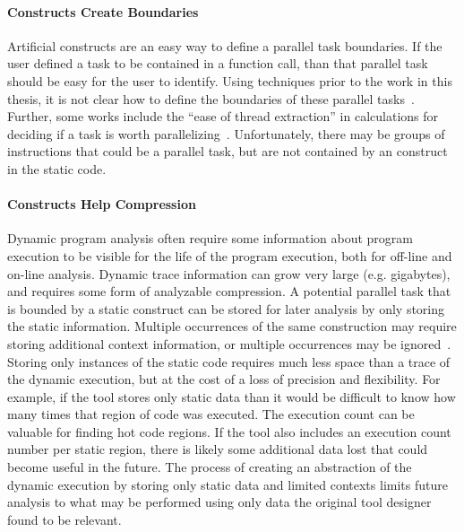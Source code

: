 \documentclass[defaultstyle,11pt]{thesis}
\begin{document}
\noindent\paragraph{Constructs Create Boundaries}

Artificial constructs are an easy way to define a parallel task
boundaries.  If the user defined a task to be contained in a function
call, than that parallel task should be easy for the user to
identify.  Using techniques prior to the work in this thesis, it is
not clear how to define the boundaries of these parallel
tasks~\cite{jeon:2011:hotpar, garcia:2011:pldi}.  Further, some works
include the ``ease of thread extraction'' in calculations for deciding
if a task is worth parallelizing~\cite{garcia:2011:pldi}.
Unfortunately, there may be groups of instructions that could be a
parallel task, but are not contained by an construct in the static
code.

\noindent\paragraph{Constructs Help Compression}

Dynamic program analysis often require some information about program
execution to be visible for the life of the program execution, both
for off-line and on-line analysis.  Dynamic trace information can grow
very large (e.g. gigabytes), and requires some form of analyzable
compression.  A potential parallel task that is bounded by a static
construct can be stored for later analysis by only storing the static
information. Multiple occurrences of the same construction may require
storing additional context information, or multiple occurrences may be
ignored~\cite{minjang:10:micro, jeon:2011:hotpar, garcia:2011:pldi}.
Storing only instances of the static code requires much less space
than a trace of the dynamic execution, but at the cost of a loss of
precision and flexibility.  For example, if the tool stores only static
data than it would be difficult to know how many times that region of
code was executed. The execution count can be valuable for finding hot
code regions.  If the tool also includes an execution count number per
static region, there is likely some additional data lost that could
become useful in the future.  The process of creating an abstraction
of the dynamic execution by storing only static data and limited
contexts limits future analysis to what may be performed using only
data the original tool designer found to be relevant.
\end{document}
